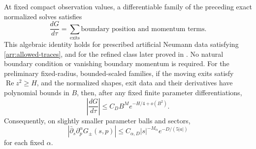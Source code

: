 \begin{lemma}\label{arr:first-variation}
At fixed compact observation values, a differentiable family of
the preceding exact normalized solves satisfies
\[
 \frac{dG}{d\tau}
   =\sum_{\text{exits}}\text{boundary position and momentum terms}.
\]
This algebraic identity holds for prescribed artificial Neumann data
satisfying \eqref{arr:allowed-traces}, and for the refined class later
proved in .  No natural boundary condition
or vanishing boundary momentum is required.
For the preliminary fixed-radius, bounded-scaled families, if the moving exits satisfy
\(\operatorname{Re}z^2\ge H\), and the normalized shapes, exit
data and their derivatives have polynomial bounds in \(B\),
then, after any fixed finite parameter differentiations,
\begin{equation}\label{arr:endpoint-estimate}
 \left|\frac{dG}{d\tau}\right|
 \le C_D B^M e^{-H/4+o(B^2)}.
\end{equation}
Consequently, on slightly smaller parameter balls and sectors,
\begin{equation}\label{arr:dbar}
 |\bar\partial_s\partial_p^\alpha G_\pm(s,p)|
 \le C_{\alpha,D}|s|^{-M_\alpha}e^{-D/(5|a|)}
\end{equation}
for each fixed \(\alpha\).
\end{lemma}

